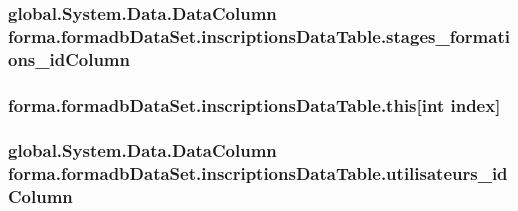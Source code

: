 \subsubsection[{\texorpdfstring{stages\+\_\+formations\+\_\+id\+Column}{stages_formations_idColumn}}]{\setlength{\rightskip}{0pt plus 5cm}global.\+System.\+Data.\+Data\+Column forma.\+formadb\+Data\+Set.\+inscriptions\+Data\+Table.\+stages\+\_\+formations\+\_\+id\+Column\hspace{0.3cm}{\ttfamily [get]}}\hypertarget{classforma_1_1formadb_data_set_1_1inscriptions_data_table_a529c11ab1e86a0b980a1ccee15601f85}{}\label{classforma_1_1formadb_data_set_1_1inscriptions_data_table_a529c11ab1e86a0b980a1ccee15601f85}
\subsubsection[{\texorpdfstring{this[int index]}{this[int index]}}]{ forma.\+formadb\+Data\+Set.\+inscriptions\+Data\+Table.\+this\mbox{[}int index\mbox{]}\hspace{0.3cm}{\ttfamily [get]}}\hypertarget{classforma_1_1formadb_data_set_1_1inscriptions_data_table_aabeb2165b2156555c66d19fe6126c905}{}\label{classforma_1_1formadb_data_set_1_1inscriptions_data_table_aabeb2165b2156555c66d19fe6126c905}
\subsubsection[{\texorpdfstring{utilisateurs\+\_\+id\+Column}{utilisateurs_idColumn}}]{\setlength{\rightskip}{0pt plus 5cm}global.\+System.\+Data.\+Data\+Column forma.\+formadb\+Data\+Set.\+inscriptions\+Data\+Table.\+utilisateurs\+\_\+id\+Column\hspace{0.3cm}{\ttfamily [get]}}\hypertarget{classforma_1_1formadb_data_set_1_1inscriptions_data_table_ae10dfa254d4b3dbf2661a7806721bf99}{}\label{classforma_1_1formadb_data_set_1_1inscriptions_data_table_ae10dfa254d4b3dbf2661a7806721bf99}


